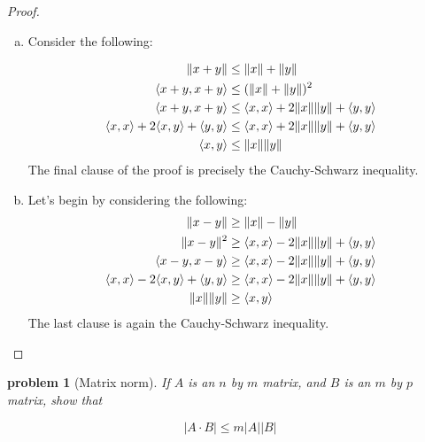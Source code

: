 \documentclass[10pt, oneside]{article}   	%
\newcommand{\innerprod}[2]{\langle #1, #2 \rangle}
\DeclarePairedDelimiter{\norm}{\lVert}{\rVert}
\newtheorem{problem}[theorem]{problem}
\begin{document}
\begin{proof}
\begin{enumerate}[a)]
\item Consider the following: 

	\begin{equation}
		\begin{aligned}
			\norm{x + y} &\leq \norm{x} + \norm{y} \\
			\innerprod{x + y}{x + y} &\leq (\norm{x} + \norm{y})^2 \\
			\innerprod{x + y}{x + y} &\leq \innerprod{x}{x} + 2\norm{x}\norm{y} + \innerprod{y}{y} \\
			\innerprod{x}{x} + 2\innerprod{x}{y} + \innerprod{y}{y} &\leq \innerprod{x}{x} + 2\norm{x}\norm{y} + \innerprod{y}{y} \\
			\innerprod{x}{y} &\leq \norm{x}\norm{y} 			
		\end{aligned}
	\end{equation}	
	The final clause of the proof is precisely the Cauchy-Schwarz inequality.	
	
	\item Let's begin by considering the following: 
	\begin{equation}
		\begin{aligned}
			\norm{x - y} &\geq \norm{x} - \norm{y} \\
			\norm{x - y}^2 &\geq \innerprod{x}{x} - 2 \norm{x}\norm{y} + \innerprod{y}{y} \\ 
			\innerprod{x - y}{x - y} & \geq \innerprod{x}{x} - 2 \norm{x}\norm{y} + \innerprod{y}{y}  \\
			\innerprod{x}{x} - 2\innerprod{x}{y} + \innerprod{y}{y} &\geq \innerprod{x}{x} - 2 \norm{x}\norm{y} + \innerprod{y}{y}  \\
			\norm{x}\norm{y} &\geq \innerprod{x}{y} 
	 	\end{aligned}
	\end{equation}
	The last clause is again the Cauchy-Schwarz inequality.
\end{enumerate}
\end{proof}

\begin{problem}[Matrix norm]

If $A$ is an $n$ by $m$ matrix, and $B$ is an $m$ by $p$ matrix, show that 

\begin{center}
\begin{equation}
	|A \cdot B| \leq m |A||B|
\end{equation}
\end{center}
\end{problem}
\end{document}

